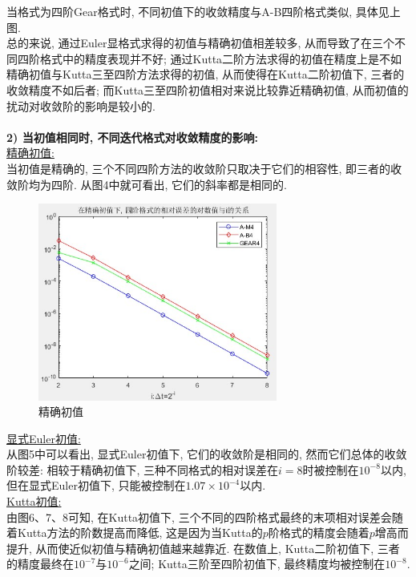 \documentclass[12pt]{article}
\begin{document}
\noindent 当格式为四阶Gear格式时, 不同初值下的收敛精度与A-B四阶格式类似, 具体见上图.\\
总的来说, 通过Euler显格式求得的初值与精确初值相差较多, 从而导致了在三个不同四阶格式中的精度表现并不好; 通过Kutta二阶方法求得的初值在精度上是不如精确初值与Kutta三至四阶方法求得的初值, 从而使得在Kutta二阶初值下, 三者的收敛精度不如后者; 而Kutta三至四阶初值相对来说比较靠近精确初值, 从而初值的扰动对收敛阶的影响是较小的.\\
\quad \\

\noindent \textbf{2) 当初值相同时, 不同迭代格式对收敛精度的影响: }\\
\underline{精确初值:}\\
当初值是精确的, 三个不同四阶方法的收敛阶只取决于它们的相容性, 即三者的收敛阶均为四阶. 从图4中就可看出, 它们的斜率都是相同的.
\begin{figure}[H]
	\centering
	\includegraphics[width=0.7\textwidth]{4}
	\caption{精确初值}
\end{figure}
\noindent \underline{显式Euler初值:}\\
从图5中可以看出, 显式Euler初值下, 它们的收敛阶是相同的, 然而它们总体的收敛阶较差: 相较于精确初值下, 三种不同格式的相对误差在$i=8$时被控制在$10^{-8}$以内, 但在显式Euler初值下, 只能被控制在$1.07\times10^{-4}$以内.\\
\noindent \underline{Kutta初值:}\\
由图6、7、8可知, 在Kutta初值下, 三个不同的四阶格式最终的末项相对误差会随着Kutta方法的阶数提高而降低, 这是因为当Kutta的$p$阶格式的精度会随着$p$增高而提升, 从而使近似初值与精确初值越来越靠近. 在数值上, Kutta二阶初值下, 三者的精度最终在$10^{-7}$与$10^{-6}$之间; Kutta三阶至四阶初值下, 最终精度均被控制在$10^{-8}$.
\end{document}
